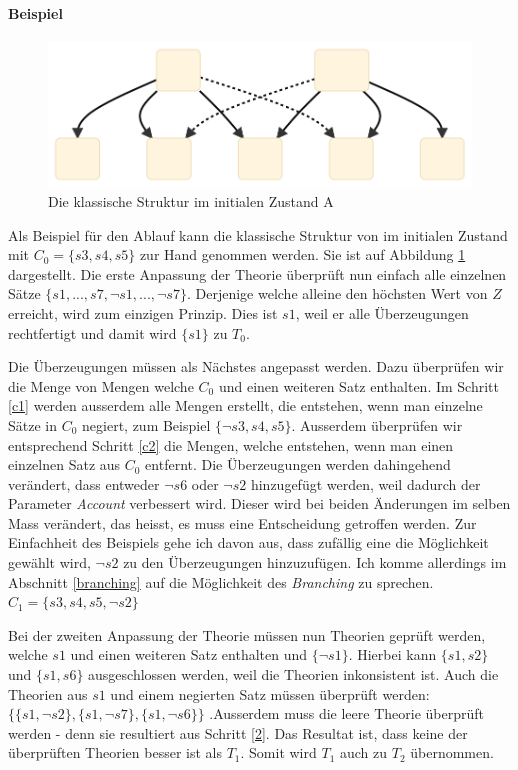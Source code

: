 \documentclass{article}
\begin{document}
\paragraph{Beispiel}
\begin{figure}[h]
  \centering
  \includegraphics[width=\textwidth]{classical_initial1}
  \caption{Die klassische Struktur im initialen Zustand A\label{fig:classset-initial1}}
\end{figure}

 Als Beispiel für den Ablauf kann die klassische Struktur von \cite{beisbart_making_2015} im initialen Zustand mit $C_0 = \{s3, s4, s5\}$ zur Hand genommen werden. Sie ist auf Abbildung \ref{fig:classset-initial1} dargestellt. Die erste Anpassung der Theorie überprüft nun einfach alle einzelnen Sätze $\{s1,...,s7, \neg s1, ..., \neg s7\}$. Derjenige welche alleine den höchsten Wert von $Z$ erreicht, wird zum einzigen Prinzip. Dies ist $s1$, weil er alle Überzeugungen rechtfertigt und damit wird $\{s1\}$ zu $T_0$.
 
 Die Überzeugungen müssen als Nächstes angepasst werden. Dazu überprüfen wir die Menge von Mengen welche $C_0$ und einen weiteren Satz enthalten. Im Schritt \ref{c1} werden ausserdem alle Mengen erstellt, die entstehen, wenn man einzelne Sätze in $C_0$ negiert, zum Beispiel $\{\lnot s3, s4, s5\}$. Ausserdem überprüfen wir entsprechend Schritt \ref{c2} die Mengen, welche entstehen, wenn man einen einzelnen Satz aus $C_0$ entfernt. Die Überzeugungen werden dahingehend verändert, dass entweder $\neg s6$ oder $\neg s2$ hinzugefügt werden, weil dadurch der Parameter \textit{Account} verbessert wird. Dieser wird bei beiden Änderungen im selben Mass verändert, das heisst, es muss eine Entscheidung getroffen werden. Zur Einfachheit des Beispiels gehe ich davon aus, dass zufällig eine die Möglichkeit gewählt wird, $\neg s2$ zu den Überzeugungen hinzuzufügen. Ich komme allerdings im Abschnitt \ref{branching} auf die Möglichkeit des \textit{Branching} zu sprechen. $C_1 = \{s3, s4, s5, \neg s2\}$
 
 Bei der zweiten Anpassung der Theorie müssen nun Theorien geprüft werden, welche $s1$ und einen weiteren Satz enthalten und $\{\neg s1\}$. Hierbei kann $\{s1,s2\}$ und $\{s1,s6\}$ ausgeschlossen werden, weil die Theorien inkonsistent ist. Auch die Theorien aus $s1$ und einem negierten Satz müssen überprüft werden: $\{\{s1,\neg s2\}, \{s1,\neg s7\}, \{s1,\neg s6\}\}$ .Ausserdem muss die leere Theorie überprüft werden - denn sie resultiert aus Schritt \ref{2}. Das Resultat ist, dass keine der überprüften Theorien besser ist als $T_1$. Somit wird $T_1$ auch zu $T_2$ übernommen.
 
\end{document}
